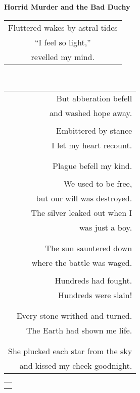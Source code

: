 \documentclass{article}
\begin{document}
\begin{center}
\textbf{Horrid Murder and the Bad Duchy} \\
\begin{tabular}{c}
\\
Fluttered wakes by astral tides \\
``I feel so light,'' \\
revelled my mind. \\
\end{tabular} \\
\begin{tabular}{r}
\\
But abberation befell \\
and washed hope away. \\
\\
Embittered by stance \\
I let my heart recount. \\
\\
\\
Plague befell my kind. \\
\\
We used to be free, \\
but our will\hspace{2ex} was destroyed. \\
The silver leaked out\hspace{2ex} when I \\
was just a boy. \\
\\
\\
The sun sauntered down \\
where the battle was waged. \\
\\
Hundreds had fought. \\
Hundreds were slain! \\
\\
\\
Every stone writhed and turned. \\
The Earth had shown me life. \\
\\
\\
She plucked each star from the sky \\
and kissed my cheek goodnight. \\
\end{tabular}
\begin{tabular}{l}
\\
\\
\\

\end{tabular}
\end{center}
\end{document}
